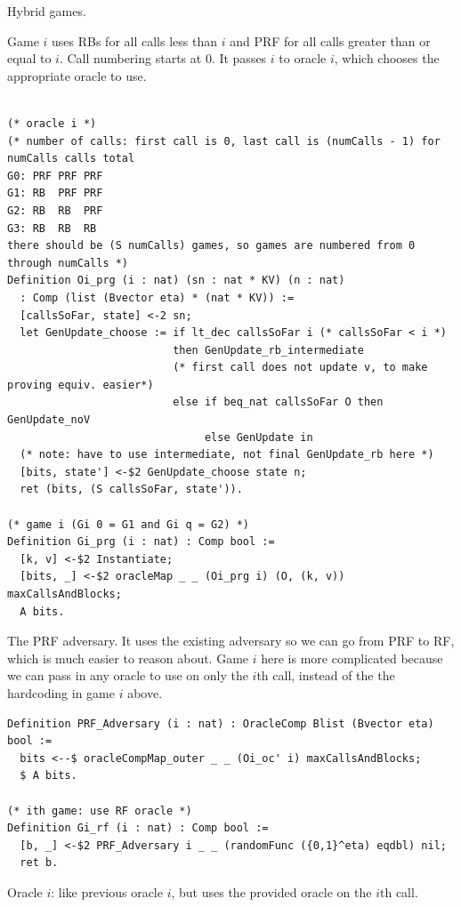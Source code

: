 \documentclass[12pt,lot, lof]{puthesis}
\begin{document}
{Hybrid games. 

Game $i$ uses RBs for all calls less than $i$ and PRF for all calls greater than or equal to $i$. Call numbering starts at $0$. It passes $i$ to oracle $i$, which chooses the appropriate oracle to use.

\begin{lstlisting}

(* oracle i *)
(* number of calls: first call is 0, last call is (numCalls - 1) for numCalls calls total
G0: PRF PRF PRF
G1: RB  PRF PRF
G2: RB  RB  PRF
G3: RB  RB  RB 
there should be (S numCalls) games, so games are numbered from 0 through numCalls *)
Definition Oi_prg (i : nat) (sn : nat * KV) (n : nat)
  : Comp (list (Bvector eta) * (nat * KV)) :=
  [callsSoFar, state] <-2 sn;
  let GenUpdate_choose := if lt_dec callsSoFar i (* callsSoFar < i *)
                          then GenUpdate_rb_intermediate
                          (* first call does not update v, to make proving equiv. easier*)
                          else if beq_nat callsSoFar O then GenUpdate_noV
                               else GenUpdate in
  (* note: have to use intermediate, not final GenUpdate_rb here *)
  [bits, state'] <-$2 GenUpdate_choose state n;
  ret (bits, (S callsSoFar, state')).

(* game i (Gi 0 = G1 and Gi q = G2) *)
Definition Gi_prg (i : nat) : Comp bool :=
  [k, v] <-$2 Instantiate;
  [bits, _] <-$2 oracleMap _ _ (Oi_prg i) (O, (k, v)) maxCallsAndBlocks;
  A bits.
\end{lstlisting}  

The PRF adversary. It uses the existing adversary so we can go from PRF to RF, which is much easier to reason about. Game $i$ here is more complicated because we can pass in any oracle to use on only the $i$th call, instead of the the hardcoding in game $i$ above. 

\begin{lstlisting}
Definition PRF_Adversary (i : nat) : OracleComp Blist (Bvector eta) bool :=
  bits <--$ oracleCompMap_outer _ _ (Oi_oc' i) maxCallsAndBlocks;
  $ A bits.

(* ith game: use RF oracle *)
Definition Gi_rf (i : nat) : Comp bool :=
  [b, _] <-$2 PRF_Adversary i _ _ (randomFunc ({0,1}^eta) eqdbl) nil;
  ret b.
\end{lstlisting}

Oracle $i$: like previous oracle $i$, but uses the provided oracle on the $i$th call.

}
\end{document}
